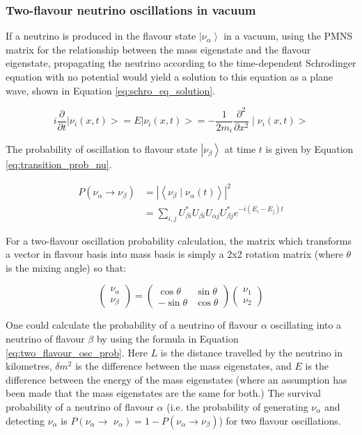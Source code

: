 \subsubsection{Two-flavour neutrino oscillations in vacuum}

If a neutrino is produced in the flavour state $\left|\nu_{\alpha}\right\rangle$ in a vacuum, using the PMNS matrix for the relationship between the mass eigenstate and the flavour eigenstate, propagating the neutrino according to the time-dependent Schrodinger equation with no potential would yield a solution to this equation as a plane wave, shown in Equation \ref{eq:schro_eq_solution}.

\begin{equation}
i \frac{\partial}{\partial t}\left|\nu_{i}(x, t)>=E\right| \nu_{i}(x, t)>=-\frac{1}{2 m_{i}} \frac{\partial^{2}}{\partial x^{2}} \mid \nu_{i}(x, t)>
\label{eq:schro_eq_solution}   
\end{equation}

The probability of oscillation to flavour state $\left|\nu_{\beta}\right\rangle$ at time $t$ is given by Equation \ref{eq:transition_prob_nu}. 

$$
\begin{aligned}
P\left(\nu_{\alpha} \rightarrow \nu_{\beta}\right) &=\left|\left\langle\nu_{\beta} \mid \nu_{\alpha}(t)\right\rangle\right|^{2} \\
&=\sum_{i, j} U_{\beta i}^{*} U_{\beta i} U_{\alpha j} U_{\beta j}^{*} e^{-i\left(E_{i}-E_{j}\right) t}
\end{aligned}
\label{eq:transition_prob_nu}
$$

For a two-flavour oscillation probability calculation, the matrix which transforms a vector in flavour basis into mass basis is simply a 2x2 rotation matrix (where $\theta$ is the mixing angle) so that:

$$
\left(\begin{array}{l}
\nu_{\alpha} \\
\nu_{\beta}
\end{array}\right)=\left(\begin{array}{cc}
\cos \theta & \sin \theta \\
-\sin \theta & \cos \theta
\end{array}\right)\left(\begin{array}{l}
\nu_{1} \\
\nu_{2}
\end{array}\right)
\label{eq:rotation matrix}
$$


One could calculate the probability of a neutrino of flavour $\alpha$ oscillating into a neutrino of flavour $\beta$ by using the formula in Equation \ref{eq:two_flavour_osc_prob}. Here $L$ is the distance travelled by the neutrino in kilometres, $\delta m^{2}$ is the difference between the mass eigenstates, and $E$ is the difference between the energy of the mass eigenstates (where an assumption has been made that the mass eigenstates are the same for both.) The survival probability of a neutrino of flavour $\alpha$ (i.e. the probability of generating $\nu_{\alpha}$ and detecting $\nu_{\alpha}$ is $P\left(\nu_{\alpha} \rightarrow\right.$ $\left.\nu_{\alpha}\right)=1-P\left(\nu_{\alpha} \rightarrow \nu_{\beta}\right)$) for two flavour oscillations. 

